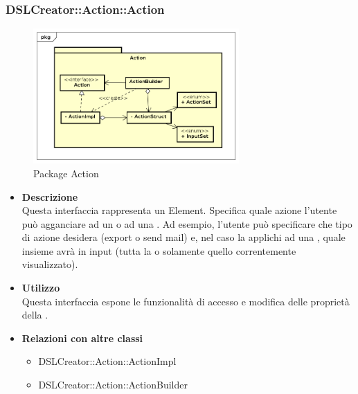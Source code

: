  \subsubsection{DSLCreator::Action::Action}
                 \begin{figure}[H]
                  \centering
                  \includegraphics[width=0.7\textwidth]{res/img/Action.png}
                  \caption{Package Action}
                  \label{fig:diagram_model}
                \end{figure}
                    \begin{itemize}
                        \item \textbf{Descrizione} \hfill \\
                          Questa interfaccia rappresenta un  Element. Specifica quale azione l'utente può agganciare ad un  o ad una . Ad esempio, l'utente può specificare che tipo di azione desidera (export o send mail) e, nel caso la applichi ad una , quale insieme avrà in input (tutta la  o solamente quello correntemente visualizzato).
                        \item \textbf{Utilizzo} \hfill \\
                          Questa interfaccia espone le funzionalità di accesso e modifica delle proprietà della .
                        \item \textbf{Relazioni con altre classi}
                            \begin{itemize}
                              \item DSLCreator::Action::ActionImpl
                              \item DSLCreator::Action::ActionBuilder
                            \end{itemize}
                    \end{itemize}  

